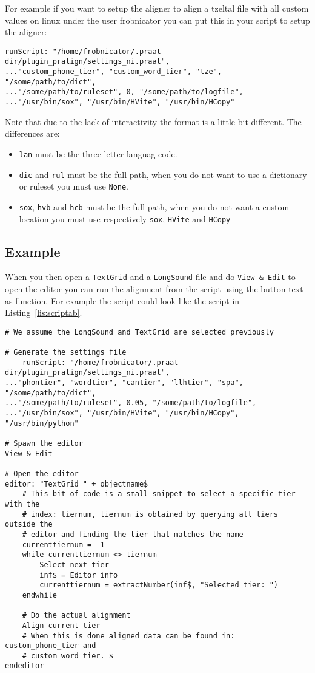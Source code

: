 For example if you want to setup the aligner to align a tzeltal file with all
custom values on linux under the user frobnicator you can put this in your
script to setup the aligner:

\begin{lstlisting}
runScript: "/home/frobnicator/.praat-dir/plugin_pralign/settings_ni.praat",
..."custom_phone_tier", "custom_word_tier", "tze", "/some/path/to/dict",
..."/some/path/to/ruleset", 0, "/some/path/to/logfile",
..."/usr/bin/sox", "/usr/bin/HVite", "/usr/bin/HCopy"
\end{lstlisting}

Note that due to the lack of interactivity the format is a little bit
different. The differences are:
\begin{itemize}
	\item \texttt{lan} must be the three letter languag code.
	\item \texttt{dic} and \texttt{rul} must be the full path, when you do not
want to use a dictionary or ruleset you must use \texttt{None}.
	\item \texttt{sox}, \texttt{hvb} and \texttt{hcb} must be the full path, when
you do not want a custom location you must use respectively \texttt{sox},
\texttt{HVite} and \texttt{HCopy}
\end{itemize}

\subsection{Example}
When you then open a \texttt{TextGrid} and a \texttt{LongSound} file and do
\texttt{View \& Edit} to open the editor you can run the alignment from the
script using the button text as function. For example the script could look
like the script in Listing~\ref{lis:scriptab}.

\begin{lstlisting}[caption={Example scriptability},label={lis:scriptab}]
# We assume the LongSound and TextGrid are selected previously

# Generate the settings file
	runScript: "/home/frobnicator/.praat-dir/plugin_pralign/settings_ni.praat",
..."phontier", "wordtier", "cantier", "llhtier", "spa", "/some/path/to/dict",
..."/some/path/to/ruleset", 0.05, "/some/path/to/logfile",
..."/usr/bin/sox", "/usr/bin/HVite", "/usr/bin/HCopy", "/usr/bin/python"

# Spawn the editor
View & Edit

# Open the editor
editor: "TextGrid " + objectname$
	# This bit of code is a small snippet to select a specific tier with the
	# index: tiernum, tiernum is obtained by querying all tiers outside the
	# editor and finding the tier that matches the name
	currenttiernum = -1
	while currenttiernum <> tiernum
		Select next tier
		inf$ = Editor info
		currenttiernum = extractNumber(inf$, "Selected tier: ")
	endwhile
	
	# Do the actual alignment
	Align current tier
	# When this is done aligned data can be found in: custom_phone_tier and 
	# custom_word_tier. $
endeditor
\end{lstlisting}


